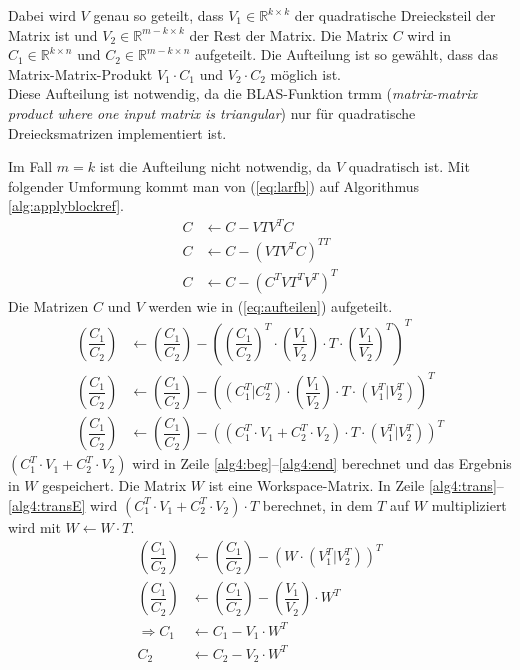 Dabei wird $V$ genau so geteilt, dass $V_1 \in \mathbb{R}^{k\times k}$ der quadratische Dreiecksteil der Matrix ist und $V_2 \in \mathbb{R}^{m-k\times k}$ der Rest der Matrix. Die Matrix $C$ wird in $C_1 \in \mathbb{R}^{k \times n}$ und $C_2 \in \mathbb{R}^{m-k \times n}$  aufgeteilt. Die Aufteilung ist so gewählt, dass das Matrix-Matrix-Produkt $V_1 \cdot C_1$ und $V_2 \cdot C_2$ möglich ist.\\
Diese Aufteilung ist notwendig, da die BLAS-Funktion trmm (\textit{matrix-matrix product where one input matrix is triangular}) nur für quadratische Dreiecksmatrizen implementiert ist.

Im Fall $ m = k $ ist die Aufteilung nicht notwendig, da $ V $ quadratisch ist.
\newpage
Mit folgender Umformung kommt man von (\ref{eq:larfb}) auf Algorithmus \ref{alg:applyblockref}.
\begin{align*}
	C &\leftarrow  C - V T V^T C \\
	C &\leftarrow C - \left(V T V^T C\right)^{TT} 	\\
	C &\leftarrow  C - \left(C^T  V  T^T  V^T\right)^T
\end{align*}
Die Matrizen $C$ und $V$ werden wie in (\ref{eq:aufteilen}) aufgeteilt.
\begin{align*}
	\left(\dfrac{C_1}{C_2}\right) &\leftarrow  \left(\dfrac{C_1}{C_2}\right) -  \left( \left(\dfrac{C_1}{C_2}\right)^T \cdot \left(\dfrac{V_1}{V_2}\right) \cdot T \cdot \left(\dfrac{V_1}{V_2}\right)^T \right)^T \\
	\left(\dfrac{C_1}{C_2}\right) &\leftarrow  \left(\dfrac{C_1}{C_2}\right) - \left( \left(C_1^T|C_2^T\right)	\cdot \left(\dfrac{V_1}{V_2}\right) \cdot T \cdot \left(V_1^T|V_2^T\right) \right)^T \\
	\left(\dfrac{C_1}{C_2}\right) &\leftarrow  \left(\dfrac{C_1}{C_2}\right) - \left( \left( C_1^T \cdot V_1 + C_2^T \cdot V_2 \right) \cdot T \cdot \left(V_1^T|V_2^T\right) \right)^T 
\end{align*}
$ \left( C_1^T \cdot V_1 + C_2^T \cdot V_2 \right) $ wird in Zeile \ref{alg4:beg}--\ref{alg4:end} berechnet und das Ergebnis in $W$ gespeichert. Die Matrix $W$ ist eine Workspace-Matrix. In Zeile \ref{alg4:trans}--\ref{alg4:transE} wird  $ \left( C_1^T \cdot V_1 + C_2^T \cdot V_2 \right) \cdot T$ berechnet, in dem $T$ auf $W$ multipliziert wird mit $W \leftarrow W \cdot T$. 
\begin{align*}
	\left(\dfrac{C_1}{C_2}\right) &\leftarrow  \left(\dfrac{C_1}{C_2}\right) - \left( W \cdot \left(V_1^T|V_2^T\right) \right)^T \\
	\left(\dfrac{C_1}{C_2}\right) &\leftarrow  \left(\dfrac{C_1}{C_2}\right) - \left(\dfrac{V_1}{V_2}\right) \cdot W^T 	\\
	\Longrightarrow C_1 &\leftarrow C_1 - V_1 \cdot W^T\\
	C_2 &\leftarrow C_2 - V_2 \cdot W^T	
\end{align*}

